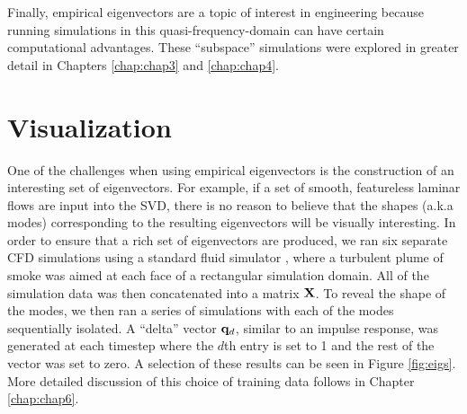 Finally, empirical eigenvectors are a topic of interest in engineering because running simulations in this quasi-frequency-domain can have certain computational advantages. These ``subspace'' simulations were explored in greater detail in Chapters \ref{chap:chap3} and \ref{chap:chap4}.


\section{Visualization}
\label{sec:visualization}

One of the challenges when using empirical eigenvectors is the construction of an interesting set of eigenvectors. For example, if a set of smooth, featureless laminar flows are input into the SVD, there is no reason to believe that the shapes (a.k.a modes) corresponding to the resulting eigenvectors will be visually interesting. In order to ensure that a rich set of eigenvectors are produced, we ran six separate CFD simulations using a standard fluid simulator \cite{Stam99}, where a turbulent plume of smoke was aimed at each face of a rectangular simulation domain. All of the simulation data was then concatenated into a matrix $\mathbf{X}$. To reveal the shape of the modes, we then ran a series of simulations with each of the modes sequentially isolated. A ``delta'' vector $\mathbf{q}_d$, similar to an impulse response, was generated at each timestep where the $d$th entry is set to 1 and the rest of the vector was set to zero. A selection of these results can be seen in Figure \ref{fig:eigs}. More detailed discussion of this choice of training data follows in Chapter \ref{chap:chap6}.

